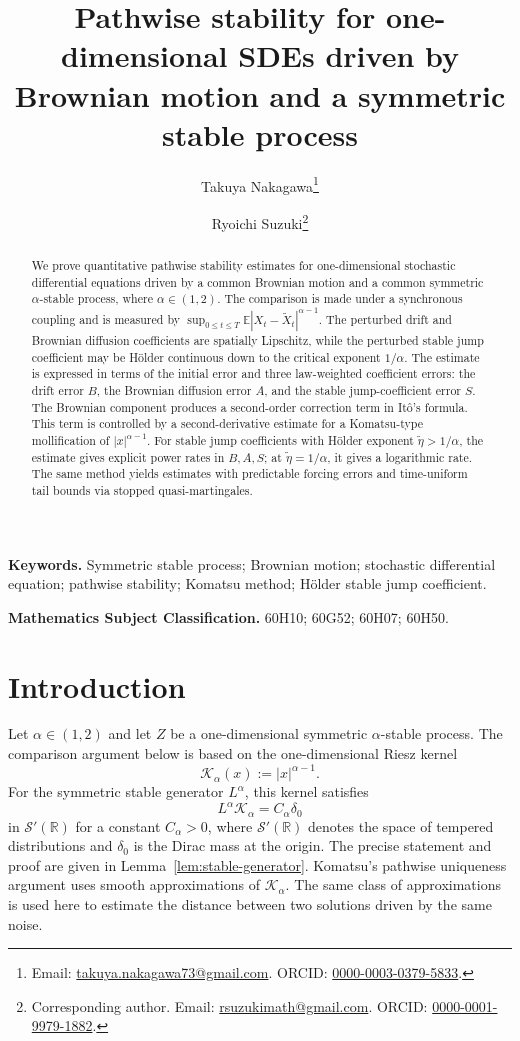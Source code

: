\documentclass[11pt]{article}
\title{Pathwise stability for one-dimensional SDEs driven by Brownian motion and a symmetric stable process}
\author[1]{Takuya Nakagawa\thanks{Email: \href{mailto:takuya.nakagawa73@gmail.com}{takuya.nakagawa73@gmail.com}. ORCID: \href{https://orcid.org/0000-0003-0379-5833}{0000-0003-0379-5833}.}}
\author[2]{Ryoichi Suzuki\thanks{Corresponding author. Email: \href{mailto:rsuzukimath@gmail.com}{rsuzukimath@gmail.com}. ORCID: \href{https://orcid.org/0000-0001-9979-1882}{0000-0001-9979-1882}.}}
\affil[1]{Graduate School of Science, Kyoto University, Yoshida-honmachi, Kyoto 606--8501, Japan}
\affil[2]{Department of Business Economics, School of Management, Tokyo University of Science, 1--11--2 Fujimi, Chiyoda-city, Tokyo 102--0071, Japan}
\date{}
\newcommand{\1}{\mathbf{1}}
\newcommand{\wt}{\tilde}
\newcommand{\RieszK}{\mathcal K_\alpha}
\begin{document}
\maketitle

\begin{abstract}
We prove quantitative pathwise stability estimates for one-dimensional stochastic differential equations driven by a common Brownian motion and a common symmetric $\alpha$-stable process, where $\alpha\in(1,2)$. The comparison is made under a synchronous coupling and is measured by $\sup_{0\le t\le T}\mathbb E|X_t-\wt X_t|^{\alpha-1}$. The perturbed drift and Brownian diffusion coefficients are spatially Lipschitz, while the perturbed stable jump coefficient may be H\"older continuous down to the critical exponent $1/\alpha$. The estimate is expressed in terms of the initial error and three law-weighted coefficient errors: the drift error $B$, the Brownian diffusion error $A$, and the stable jump-coefficient error $S$. The Brownian component produces a second-order correction term in It\^o's formula. This term is controlled by a second-derivative estimate for a Komatsu-type mollification of $|x|^{\alpha-1}$. For stable jump coefficients with H\"older exponent $\wt\eta>1/\alpha$, the estimate gives explicit power rates in $B,A,S$; at $\wt\eta=1/\alpha$, it gives a logarithmic rate. The same method yields estimates with predictable forcing errors and time-uniform tail bounds via stopped quasi-martingales.
\end{abstract}

\noindent\textbf{Keywords.} Symmetric stable process; Brownian motion; stochastic differential equation; pathwise stability; Komatsu method; H\"older stable jump coefficient.

\medskip
\noindent\textbf{Mathematics Subject Classification.} 60H10; 60G52; 60H07; 60H50.

\section{Introduction}
\label{sec:introduction}

Let $\alpha\in(1,2)$ and let $Z$ be a one-dimensional symmetric $\alpha$-stable process. The comparison argument below is based on the one-dimensional Riesz kernel
\[
  \RieszK(x):=|x|^{\alpha-1}.
\]
For the symmetric stable generator $L^\alpha$, this kernel satisfies
\[
  L^\alpha \RieszK=C_\alpha\delta_0
\]
in $\mathcal S'(\mathbb R)$ for a constant $C_\alpha>0$, where $\mathcal S'(\mathbb R)$ denotes the space of tempered distributions and $\delta_0$ is the Dirac mass at the origin. The precise statement and proof are given in Lemma~\ref{lem:stable-generator}. Komatsu's pathwise uniqueness argument uses smooth approximations of $\RieszK$. The same class of approximations is used here to estimate the distance between two solutions driven by the same noise.
\end{document}
